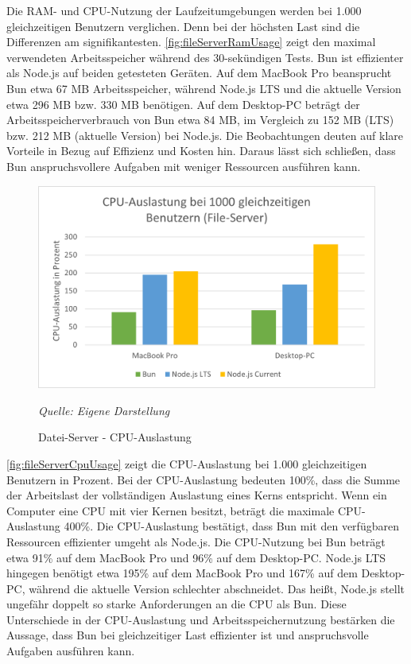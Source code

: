 \noindent
Die RAM- und CPU-Nutzung der Laufzeitumgebungen werden bei 1.000 gleichzeitigen Benutzern verglichen. Denn bei der höchsten Last sind die Differenzen am signifikantesten. \autoref{fig:fileServerRamUsage} zeigt den maximal verwendeten Arbeitsspeicher während des 30-sekündigen Tests. Bun ist effizienter als Node.js auf beiden getesteten Geräten. Auf dem MacBook Pro beansprucht Bun etwa 67 MB Arbeitsspeicher, während Node.js LTS und die aktuelle Version etwa 296 MB bzw. 330 MB benötigen. Auf dem Desktop-PC beträgt der Arbeitsspeicherverbrauch von Bun etwa 84 MB, im Vergleich zu 152 MB (LTS) bzw. 212 MB (aktuelle Version) bei Node.js. Die Beobachtungen deuten auf klare Vorteile in Bezug auf Effizienz und Kosten hin. Daraus lässt sich schließen, dass Bun anspruchsvollere Aufgaben mit weniger Ressourcen ausführen kann.\\

\begin{figure}[h!]
	\centering
	\includegraphics[width=\linewidth]{./images/fileServerCpuUsage.png}
	\caption{Datei-Server - CPU-Auslastung }
	\label{fig:fileServerCpuUsage}
	\textit{Quelle: Eigene Darstellung}
\end{figure}

\noindent
\autoref{fig:fileServerCpuUsage} zeigt die CPU-Auslastung bei 1.000 gleichzeitigen Benutzern in Prozent. Bei der CPU-Auslastung bedeuten 100\%, dass die Summe der Arbeitslast der vollständigen Auslastung eines Kerns entspricht. Wenn ein Computer eine CPU mit vier Kernen besitzt, beträgt die maximale CPU-Auslastung 400\%. Die CPU-Auslastung bestätigt, dass Bun mit den verfügbaren Ressourcen effizienter umgeht als Node.js. Die CPU-Nutzung bei Bun beträgt etwa 91\% auf dem MacBook Pro und 96\% auf dem Desktop-PC. Node.js LTS hingegen benötigt etwa 195\% auf dem MacBook Pro und 167\% auf dem Desktop-PC, während die aktuelle Version schlechter abschneidet. Das heißt, Node.js stellt ungefähr doppelt so starke Anforderungen an die CPU als Bun. Diese Unterschiede in der CPU-Auslastung und Arbeitsspeichernutzung bestärken die Aussage, dass Bun bei gleichzeitiger Last effizienter ist und anspruchsvolle Aufgaben ausführen kann.\\


